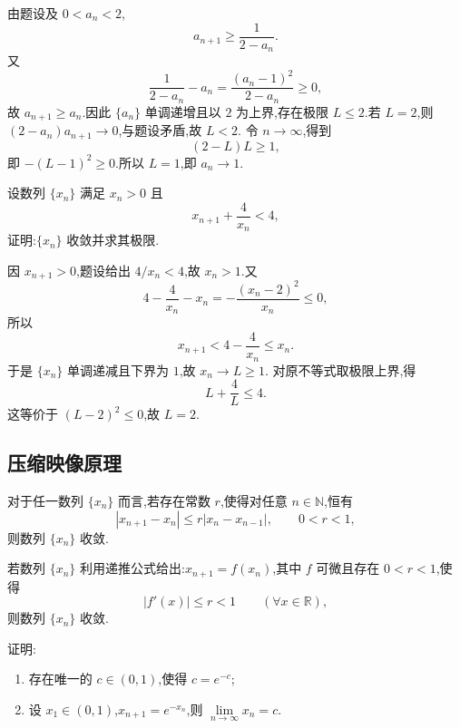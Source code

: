 \begin{solution}
  由题设及 $0<a_n<2$,
  \[
    a_{n+1}\geq\dfrac{1}{2-a_n}.
  \]
  又
  \[
    \dfrac{1}{2-a_n}-a_n
    =\dfrac{(a_n-1)^2}{2-a_n}\geq0,
  \]
  故 $a_{n+1}\geq a_n$.因此 $\{a_n\}$ 单调递增且以 $2$ 为上界,存在极限
  $L\leq2$.若 $L=2$,则 $(2-a_n)a_{n+1}\to0$,与题设矛盾,故 $L<2$.
  令 $n\to\infty$,得到
  \[
    (2-L)L\geq1,
  \]
  即 $-(L-1)^2\geq0$.所以 $L=1$,即 $a_n\to1$.
\end{solution}

\begin{example}
  设数列 $\{x_n\}$ 满足 $x_n>0$ 且
  \[
    x_{n+1}+\dfrac{4}{x_n}<4,
  \]
  证明:$\{x_n\}$ 收敛并求其极限.
\end{example}
\exampleblank

\begin{solution}
  因 $x_{n+1}>0$,题设给出 $4/x_n<4$,故 $x_n>1$.又
  \[
    4-\dfrac{4}{x_n}-x_n
    =-\dfrac{(x_n-2)^2}{x_n}\leq0,
  \]
  所以
  \[
    x_{n+1}<4-\dfrac{4}{x_n}\leq x_n.
  \]
  于是 $\{x_n\}$ 单调递减且下界为 $1$,故 $x_n\to L\geq1$.
  对原不等式取极限上界,得
  \[
    L+\dfrac{4}{L}\leq4.
  \]
  这等价于 $(L-2)^2\leq0$,故 $L=2$.
\end{solution}



\subsection{压缩映像原理}

\begin{theorem}[\markstar]
  对于任一数列 $\{x_n\}$ 而言,若存在常数 $r$,使得对任意 $n\in\mathbb N$,恒有
  \[
    |x_{n+1}-x_n|\leq r|x_n-x_{n-1}|,
    \qquad 0<r<1,
  \]
  则数列 $\{x_n\}$ 收敛.
\end{theorem}

\begin{corollary}[\markstar]
  若数列 $\{x_n\}$ 利用递推公式给出:$x_{n+1}=f(x_n)$,其中 $f$ 可微且存在 $0<r<1$,使得
  \[
    |f'(x)|\leq r<1\qquad(\forall x\in\mathbb R),
  \]
  则数列 $\{x_n\}$ 收敛.
\end{corollary}

\begin{example}
  证明:
  \begin{enumerate}
    \item 存在唯一的 $c\in(0,1)$,使得 $c=e^{-c}$;
    \item 设 $x_1\in(0,1)$,$x_{n+1}=e^{-x_n}$,则
          $\displaystyle \lim\limits_{n\to\infty}x_n=c$.
  \end{enumerate}
\end{example}
\exampleblank


